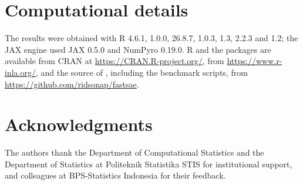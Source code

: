 \section*{Computational details}\label{computational-details}

The results were obtained with R 4.6.1,  1.0.0,  26.8.7,  1.0.3,  1.3,  2.2.3 and  1.2; the JAX engine used JAX 0.5.0 and NumPyro 0.19.0. R and the packages are available from CRAN at \url{https://CRAN.R-project.org/},  from \url{https://www.r-inla.org/}, and the source of , including the benchmark scripts, from \url{https://github.com/ridsonap/fastsae}.

\section*{Acknowledgments}\label{acknowledgments}

The authors thank the Department of Computational Statistics and the Department of Statistics at Politeknik Statistika STIS for institutional support, and colleagues at BPS-Statistics Indonesia for their feedback.



\address{%
Ridson Al Farizal P.\\
Department of Computational Statistics, Politeknik Statistika STIS\\%
Jl. Otto Iskandardinata No.~64C\\ Jakarta Timur 13330, Indonesia\\
%
%
\textit{ORCiD: \href{https://orcid.org/0000-0003-0617-0214}{0000-0003-0617-0214}}\\%
\href{mailto:alfrzlp@gmail.com}{\nolinkurl{alfrzlp@gmail.com}}%
}

\address{%
Azka Ubaidillah\\
Department of Statistics, Politeknik Statistika STIS\\%
Jl. Otto Iskandardinata No.~64C\\ Jakarta Timur 13330, Indonesia\\
%
%
\textit{ORCiD: \href{https://orcid.org/0000-0002-3597-0459}{0000-0002-3597-0459}}\\%
\href{mailto:azka@stis.ac.id}{\nolinkurl{azka@stis.ac.id}}%
}
